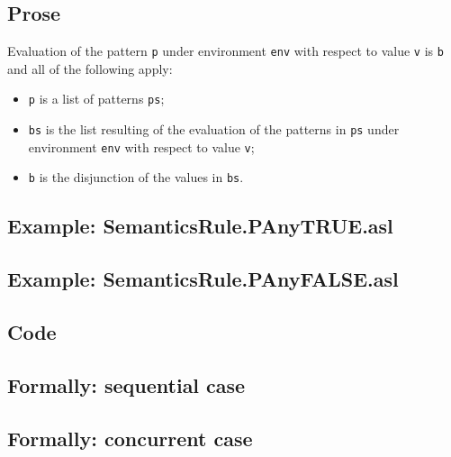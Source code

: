 \documentclass{book}
\begin{document}
    \subsection{Prose}
  Evaluation of the pattern \texttt{p} under environment \texttt{env} with
  respect to value \texttt{v} is \texttt{b} and all of the following apply:
    \begin{itemize}
      \item \texttt{p} is a list of patterns \texttt{ps};
      \item \texttt{bs} is the list resulting of the evaluation of the patterns in \texttt{ps} under environment \texttt{env} with respect to value \texttt{v};
      \item \texttt{b} is the disjunction of the values in \texttt{bs}.
    \end{itemize}

    \subsection{Example: SemanticsRule.PAnyTRUE.asl}

    \subsection{Example: SemanticsRule.PAnyFALSE.asl}

    \subsection{Code}

\begin{emptyformal}
    \subsection{Formally: sequential case}

    \subsection{Formally: concurrent case}
\end{emptyformal}

\end{document}
